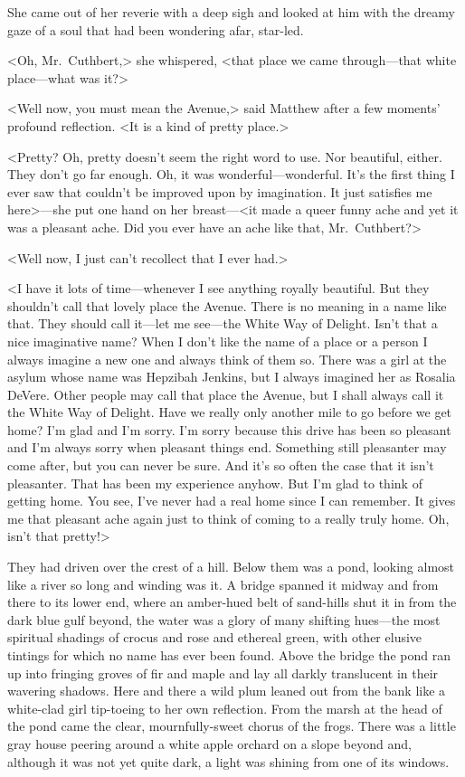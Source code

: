 She came out of her reverie with a deep sigh and looked at him with the dreamy gaze of a soul that had been wondering afar, star-led.

<Oh, Mr.~Cuthbert,> she whispered, <that place we came through—that white place—what was it?>

<Well now, you must mean the Avenue,> said Matthew after a few moments' profound reflection. <It is a kind of pretty place.>

<Pretty? Oh, pretty doesn't seem the right word to use. Nor beautiful, either. They don't go far enough. Oh, it was wonderful—wonderful. It's the first thing I ever saw that couldn't be improved upon by imagination. It just satisfies me here>—she put one hand on her breast—<it made a queer funny ache and yet it was a pleasant ache. Did you ever have an ache like that, Mr.~Cuthbert?>

<Well now, I just can't recollect that I ever had.>

<I have it lots of time—whenever I see anything royally beautiful. But they shouldn't call that lovely place the Avenue. There is no meaning in a name like that. They should call it—let me see—the White Way of Delight. Isn't that a nice imaginative name? When I don't like the name of a place or a person I always imagine a new one and always think of them so. There was a girl at the asylum whose name was Hepzibah Jenkins, but I always imagined her as Rosalia DeVere. Other people may call that place the Avenue, but I shall always call it the White Way of Delight. Have we really only another mile to go before we get home? I'm glad and I'm sorry. I'm sorry because this drive has been so pleasant and I'm always sorry when pleasant things end. Something still pleasanter may come after, but you can never be sure. And it's so often the case that it isn't pleasanter. That has been my experience anyhow. But I'm glad to think of getting home. You see, I've never had a real home since I can remember. It gives me that pleasant ache again just to think of coming to a really truly home. Oh, isn't that pretty!>

They had driven over the crest of a hill. Below them was a pond, looking almost like a river so long and winding was it. A bridge spanned it midway and from there to its lower end, where an amber-hued belt of sand-hills shut it in from the dark blue gulf beyond, the water was a glory of many shifting hues—the most spiritual shadings of crocus and rose and ethereal green, with other elusive tintings for which no name has ever been found. Above the bridge the pond ran up into fringing groves of fir and maple and lay all darkly translucent in their wavering shadows. Here and there a wild plum leaned out from the bank like a white-clad girl tip-toeing to her own reflection. From the marsh at the head of the pond came the clear, mournfully-sweet chorus of the frogs. There was a little gray house peering around a white apple orchard on a slope beyond and, although it was not yet quite dark, a light was shining from one of its windows.

